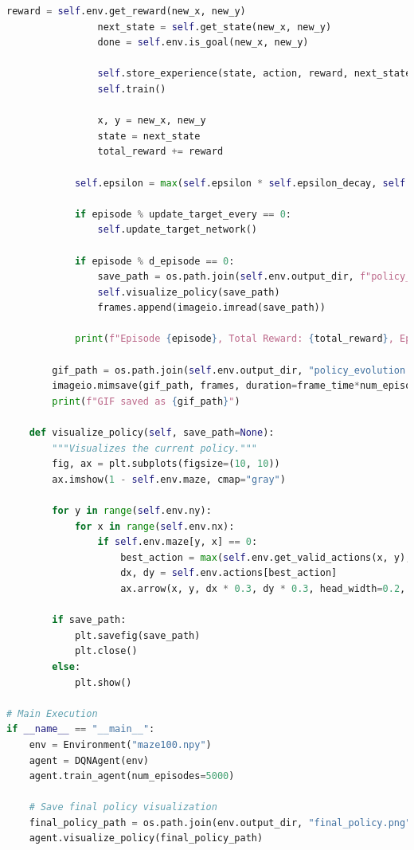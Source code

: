 \documentclass[11pt]{article}
\begin{document}
\begin{lstlisting}[language=Python]
                reward = self.env.get_reward(new_x, new_y)
                next_state = self.get_state(new_x, new_y)
                done = self.env.is_goal(new_x, new_y)

                self.store_experience(state, action, reward, next_state, done)
                self.train()

                x, y = new_x, new_y
                state = next_state
                total_reward += reward

            self.epsilon = max(self.epsilon * self.epsilon_decay, self.epsilon_min)

            if episode % update_target_every == 0:
                self.update_target_network()

            if episode % d_episode == 0:
                save_path = os.path.join(self.env.output_dir, f"policy_{episode}.png")
                self.visualize_policy(save_path)
                frames.append(imageio.imread(save_path))

            print(f"Episode {episode}, Total Reward: {total_reward}, Epsilon: {self.epsilon:.3f}")

        gif_path = os.path.join(self.env.output_dir, "policy_evolution.gif")
        imageio.mimsave(gif_path, frames, duration=frame_time*num_episodes/d_episode)
        print(f"GIF saved as {gif_path}")

    def visualize_policy(self, save_path=None):
        """Visualizes the current policy."""
        fig, ax = plt.subplots(figsize=(10, 10))
        ax.imshow(1 - self.env.maze, cmap="gray")

        for y in range(self.env.ny):
            for x in range(self.env.nx):
                if self.env.maze[y, x] == 0:
                    best_action = max(self.env.get_valid_actions(x, y), key=lambda a: self.model(self.get_state(x, y).unsqueeze(0))[0, a].item())
                    dx, dy = self.env.actions[best_action]
                    ax.arrow(x, y, dx * 0.3, dy * 0.3, head_width=0.2, head_length=0.2, fc="red", ec="red")

        if save_path:
            plt.savefig(save_path)
            plt.close()
        else:
            plt.show()

# Main Execution
if __name__ == "__main__":
    env = Environment("maze100.npy")
    agent = DQNAgent(env)
    agent.train_agent(num_episodes=5000)

    # Save final policy visualization
    final_policy_path = os.path.join(env.output_dir, "final_policy.png")
    agent.visualize_policy(final_policy_path)

\end{lstlisting}
\end{document}

